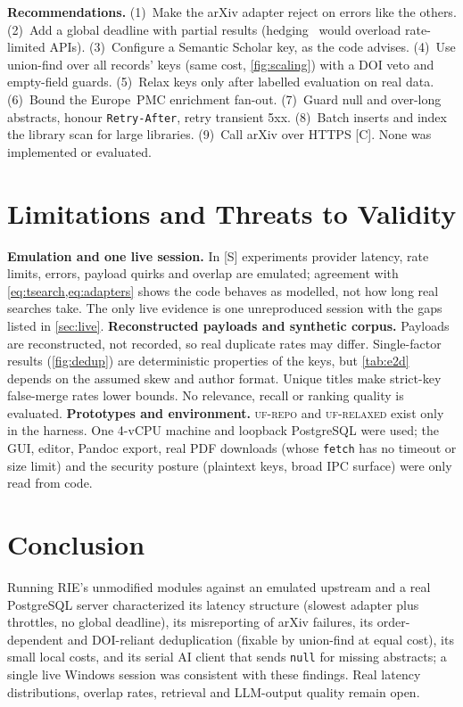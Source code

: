 \documentclass[conference]{IEEEtran}
\newcommand{\code}[1]{\texttt{\small #1}}
\newcommand{\RIE}{RIE}
\begin{document}
\textbf{Recommendations.} (1)~Make the arXiv adapter reject on errors like the others. (2)~Add a global deadline with partial results (hedging~\cite{dean2013tail} would overload rate-limited APIs). (3)~Configure a Semantic Scholar key, as the code advises. (4)~Use union-find over all records' keys (same cost, \cref{fig:scaling}) with a DOI veto and empty-field guards. (5)~Relax keys only after labelled evaluation on real data. (6)~Bound the Europe~PMC enrichment fan-out. (7)~Guard null and over-long abstracts, honour \code{Retry-After}, retry transient 5xx. (8)~Batch inserts and index the library scan for large libraries. (9)~Call arXiv over HTTPS [C]. None was implemented or evaluated.

\section{Limitations and Threats to Validity}
\label{sec:limits}

\textbf{Emulation and one live session.} In [S] experiments provider latency, rate limits, errors, payload quirks and overlap are emulated; agreement with \cref{eq:tsearch,eq:adapters} shows the code behaves as modelled, not how long real searches take. The only live evidence is one unreproduced session with the gaps listed in \cref{sec:live}.
\textbf{Reconstructed payloads and synthetic corpus.} Payloads are reconstructed, not recorded, so real duplicate rates may differ. Single-factor results (\cref{fig:dedup}) are deterministic properties of the keys, but \cref{tab:e2d} depends on the assumed skew and author format. Unique titles make strict-key false-merge rates lower bounds. No relevance, recall or ranking quality is evaluated.
\textbf{Prototypes and environment.} \textsc{uf-repo} and \textsc{uf-relaxed} exist only in the harness. One 4-vCPU machine and loopback PostgreSQL were used; the GUI, editor, Pandoc export, real PDF downloads (whose \code{fetch} has no timeout or size limit) and the security posture (plaintext keys, broad IPC surface) were only read from code.

\section{Conclusion}
\label{sec:concl}

Running \RIE's unmodified modules against an emulated upstream and a real PostgreSQL server characterized its latency structure (slowest adapter plus throttles, no global deadline), its misreporting of arXiv failures, its order-dependent and DOI-reliant deduplication (fixable by union-find at equal cost), its small local costs, and its serial AI client that sends \code{null} for missing abstracts; a single live Windows session was consistent with these findings. Real latency distributions, overlap rates, retrieval and LLM-output quality remain open.
\end{document}
